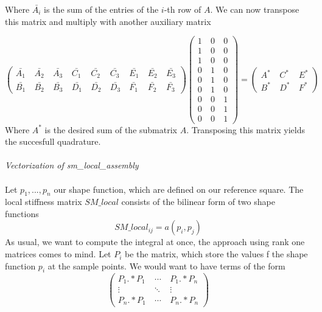 \documentclass[a4paper,12pt]{article}
\begin{document}
Where $\bar{A_i}$ is the sum of the entries of the $i$-th row of $A$. We can now transpose this matrix and multiply with another auxiliary matrix

\[\begin{pmatrix} \bar{A_1} &\ \bar{A_2} &\ \bar{A_3} &\ \bar{C_1} &\ \bar{C_2} &\ \bar{C_3} &\ \bar{E_1} &\ \bar{E_2} &\ \bar{E_3} \\
\bar{B_1} &\ \bar{B_2} &\ \bar{B_3} &\ \bar{D_1} &\ \bar{D_2} &\ \bar{D_3} &\ \bar{F_1} &\ \bar{F_2} &\ \bar{F_3} \end{pmatrix}
\begin{pmatrix} 1 &\ 0 &\ 0 \\
				1 &\ 0 &\ 0 \\
                1 &\ 0 &\ 0 \\
                0 &\ 1 &\ 0 \\
                0 &\ 1 &\ 0 \\
                0 &\ 1 &\ 0 \\
                0 &\ 0 &\ 1 \\
                0 &\ 0 &\ 1 \\
                0 &\ 0 &\ 1 \end{pmatrix} = \begin{pmatrix} A^* &\ C^* &\ E^* \\ B^* &\ D^* &\ F^* \end{pmatrix} \]
Where $A^*$ is the desired sum of the submatrix $A$. Transposing this matrix yields the succesfull quadrature.\\
\\
\textit{Vectorization of sm\_local\_assembly}\\ \\
Let $p_1,...,p_n$ our shape function, which are defined on our reference square. The local stiffness matrix $SM\_local$ consists of the bilinear form of two shape functions
\[SM\_local_{i j}=a(p_i,p_j)\]
As usual, we want to compute the integral at once, the approach using rank one matrices comes to mind. Let $P_i$ be the matrix, which store the values f the shape function $p_i$ at the sample points. We would want to have terms of the form
\begin{equation} \begin{pmatrix} P_1.*P_1 &\ \cdots &\ P_1.*P_n \\
				   \vdots  &\ \ddots &\ \vdots \\
				   P_n.*P_1 &\ \cdots &\ P_n.*P_n \end{pmatrix} \end{equation}
\end{document}
